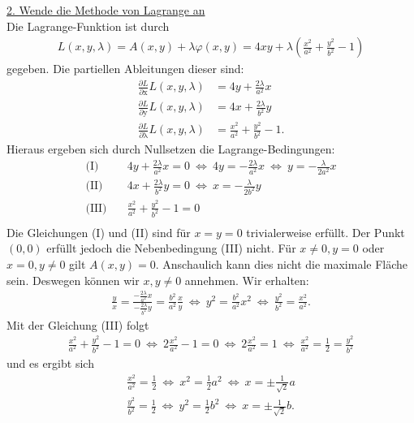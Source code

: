 \underline{2. Wende die Methode von Lagrange an}\\
Die Lagrange-Funktion ist durch
\begin{align*}
	L(x,y,\lambda) 
	= A(x,y) + \lambda\varphi(x,y)
	= 4xy + \lambda \left(\frac{x^2}{a^2} + \frac{y^2}{b^2} - 1\right)
\end{align*}
gegeben. Die partiellen Ableitungen dieser sind:
\begin{align*}
	\frac{\partial L}{\partial \mathrm{x}}L(x,y,\lambda)
	&= 4 y + \frac{2\lambda}{a^2} x \\
	\frac{\partial L}{\partial \mathrm{y}}L(x,y,\lambda)
	&= 4 x + \frac{2\lambda}{b^2} y \\
	\frac{\partial L}{\partial \mathrm{\lambda}}L(x,y,\lambda)
	&= \frac{x^2}{a^2} + \frac{y^2}{b^2} - 1.
\end{align*}
Hieraus ergeben sich durch Nullsetzen die Lagrange-Bedingungen:
\begin{align*}
	\textrm{(I)}& \quad 
	4 y + \frac{2\lambda}{a^2} x = 0
	\ \Leftrightarrow \ 4y = - \frac{2\lambda}{a^2} x 
	\ \Leftrightarrow \ y = -\frac{\lambda}{2a^2} x
	\\
	\textrm{(II)}& \quad 
	4 x + \frac{2\lambda}{b^2} y = 0
	\ \Leftrightarrow \
	x = - \frac{\lambda}{2 b^2} y 
	\\
	\textrm{(III)}& \quad 
	\frac{x^2}{a^2} + \frac{y^2}{b^2} - 1 = 0\\
\end{align*}
Die Gleichungen (I) und (II) sind für $ x = y = 0 $ trivialerweise erfüllt.
Der Punkt $ (0,0)  $ erfüllt jedoch die Nebenbedingung (III) nicht.
Für $ x \neq 0, y = 0$ oder $ x = 0, y \neq 0 $ gilt $ A(x,y) = 0 $.
Anschaulich kann dies nicht die maximale Fläche sein. Deswegen können wir $ x,y \neq 0 $ annehmen. Wir erhalten:
\begin{align*}
	\frac{y}{x} = \frac{-\frac{2 \lambda}{a^2} x}{- \frac{2\lambda}{b^2} y}
	= 
	\frac{b^2}{a^2} \frac{x}{y}
	\
	\Leftrightarrow \
	y^2 = \frac{b^2}{a^2} x^2
	\ \Leftrightarrow \
	\frac{y^2}{b^2} = \frac{x^2}{a^2}.
\end{align*}
Mit der Gleichung (III) folgt
\begin{align*}
	\frac{x^2}{a^2} + \frac{y^2}{b^2} - 1 = 0
	\ \Leftrightarrow \
	2 \frac{x^2}{a^2}  -1 = 0
	\ \Leftrightarrow \
	2 \frac{x^2}{a^2}   = 1
	\ \Leftrightarrow \
	\frac{x^2}{a^2} = \frac{1}{2} = \frac{y^2}{b^2}
\end{align*}
und es ergibt sich 
\begin{align*}
	\frac{x^2}{a^2} = \frac{1}{2} 
	 \ \Leftrightarrow \ 
	 x^2  = \frac{1}{2} a^2
	 \ \Leftrightarrow \
	 x = \pm \frac{1}{\sqrt{2}} a\\
	 \frac{y^2}{b^2} = \frac{1}{2} 
	 \ \Leftrightarrow \ 
	 y^2  = \frac{1}{2} b^2
	 \ \Leftrightarrow \
	 x = \pm \frac{1}{\sqrt{2}} b.
\end{align*}
